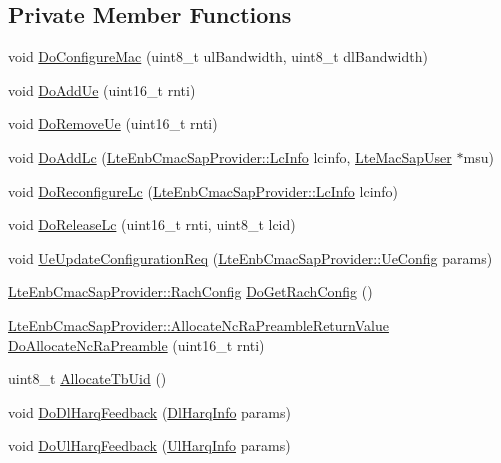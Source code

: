 \subsection*{Private Member Functions}
\begin{DoxyCompactItemize}
\item 
void \hyperlink{classns3_1_1MmWaveEnbMac_a35828bb3734c0e0f2463c649ca42f7b0}{Do\+Configure\+Mac} (uint8\+\_\+t ul\+Bandwidth, uint8\+\_\+t dl\+Bandwidth)
\item 
void \hyperlink{classns3_1_1MmWaveEnbMac_a39975a74a29d189d5b3c15565a94fc6e}{Do\+Add\+Ue} (uint16\+\_\+t rnti)
\item 
void \hyperlink{classns3_1_1MmWaveEnbMac_a430c277531907ac4855ce66c4e8df419}{Do\+Remove\+Ue} (uint16\+\_\+t rnti)
\item 
void \hyperlink{classns3_1_1MmWaveEnbMac_a78da08802017f4d1b9d0ca8b08db9765}{Do\+Add\+Lc} (\hyperlink{structns3_1_1LteEnbCmacSapProvider_1_1LcInfo}{Lte\+Enb\+Cmac\+Sap\+Provider\+::\+Lc\+Info} lcinfo, \hyperlink{classns3_1_1LteMacSapUser}{Lte\+Mac\+Sap\+User} $\ast$msu)
\item 
void \hyperlink{classns3_1_1MmWaveEnbMac_a2256dad4e982efec0c7dbe88545da5b7}{Do\+Reconfigure\+Lc} (\hyperlink{structns3_1_1LteEnbCmacSapProvider_1_1LcInfo}{Lte\+Enb\+Cmac\+Sap\+Provider\+::\+Lc\+Info} lcinfo)
\item 
void \hyperlink{classns3_1_1MmWaveEnbMac_a88bd2a72c1ddb9b75ae771d0a20b4d15}{Do\+Release\+Lc} (uint16\+\_\+t rnti, uint8\+\_\+t lcid)
\item 
void \hyperlink{classns3_1_1MmWaveEnbMac_a3fb2e0e3b7698bea7662f35572f0c8ef}{Ue\+Update\+Configuration\+Req} (\hyperlink{structns3_1_1LteEnbCmacSapProvider_1_1UeConfig}{Lte\+Enb\+Cmac\+Sap\+Provider\+::\+Ue\+Config} params)
\item 
\hyperlink{structns3_1_1LteEnbCmacSapProvider_1_1RachConfig}{Lte\+Enb\+Cmac\+Sap\+Provider\+::\+Rach\+Config} \hyperlink{classns3_1_1MmWaveEnbMac_ac90f81b482e4a026269db6d8943e0c9e}{Do\+Get\+Rach\+Config} ()
\item 
\hyperlink{structns3_1_1LteEnbCmacSapProvider_1_1AllocateNcRaPreambleReturnValue}{Lte\+Enb\+Cmac\+Sap\+Provider\+::\+Allocate\+Nc\+Ra\+Preamble\+Return\+Value} \hyperlink{classns3_1_1MmWaveEnbMac_a30e9e157b9e43a242e00d227b4127348}{Do\+Allocate\+Nc\+Ra\+Preamble} (uint16\+\_\+t rnti)
\item 
uint8\+\_\+t \hyperlink{classns3_1_1MmWaveEnbMac_a3dbc253a5c85f371ff6315820f1608af}{Allocate\+Tb\+Uid} ()
\item 
void \hyperlink{classns3_1_1MmWaveEnbMac_acb69fd90fb5f096af1c0397beefe96a9}{Do\+Dl\+Harq\+Feedback} (\hyperlink{structns3_1_1DlHarqInfo}{Dl\+Harq\+Info} params)
\item 
void \hyperlink{classns3_1_1MmWaveEnbMac_a01c9f1f0d631d8ab6e200befa64cd152}{Do\+Ul\+Harq\+Feedback} (\hyperlink{structns3_1_1UlHarqInfo}{Ul\+Harq\+Info} params)
\end{DoxyCompactItemize}
